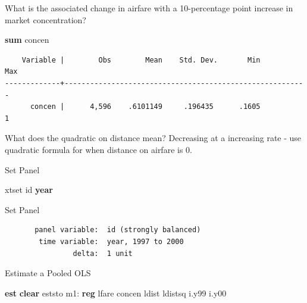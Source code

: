 \documentclass[
]{book}
\newenvironment{Shaded}{\begin{snugshade}}{\end{snugshade}}
\newcommand{\FunctionTok}[1]{\textcolor[rgb]{0.13,0.29,0.53}{\textbf{#1}}}
\newcommand{\KeywordTok}[1]{\textcolor[rgb]{0.13,0.29,0.53}{\textbf{#1}}}
\newcommand{\NormalTok}[1]{#1}
\begin{document}
What is the associated change in airfare with a 10-percentage point increase in market concentration?

\begin{Shaded}
\begin{Highlighting}[]
\KeywordTok{sum}\NormalTok{ concen}
\end{Highlighting}
\end{Shaded}

\begin{verbatim}
    Variable |        Obs        Mean    Std. Dev.       Min        Max
-------------+---------------------------------------------------------
      concen |      4,596    .6101149     .196435      .1605          1
\end{verbatim}

What does the quadratic on distance mean? Decreasing at a increasing rate - use quadratic formula for when distance on airfare is 0.

Set Panel

\begin{Shaded}
\begin{Highlighting}[]
\NormalTok{xtset id }\FunctionTok{year}
\end{Highlighting}
\end{Shaded}

Set Panel

\begin{verbatim}
       panel variable:  id (strongly balanced)
        time variable:  year, 1997 to 2000
                delta:  1 unit
\end{verbatim}

Estimate a Pooled OLS

\begin{Shaded}
\begin{Highlighting}[]
\KeywordTok{est} \KeywordTok{clear}
\NormalTok{eststo m1: }\KeywordTok{reg}\NormalTok{ lfare concen ldist ldistsq i.y99 i.y00}
\end{Highlighting}
\end{Shaded}
\end{document}
